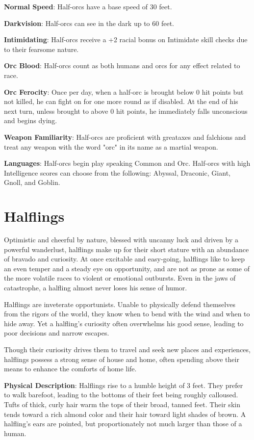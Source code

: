 \textbf{Normal Speed}: Half-orcs have a base speed of 30 feet.
				
\textbf{Darkvision}: Half-orcs can see in the dark up to 60 feet.
				
\textbf{Intimidating}: Half-orcs receive a +2 racial bonus on Intimidate skill checks due to their fearsome nature. 
				
\textbf{Orc Blood}: Half-orcs count as both humans and orcs for any effect related to race.
				
\textbf{Orc Ferocity}: Once per day, when a half-orc is brought below 0 hit points but not killed, he can fight on for one more round as if disabled. At the end of his next turn, unless brought to above 0 hit points, he immediately falls unconscious and begins dying.
				
\textbf{Weapon Familiarity}: Half-orcs are proficient with greataxes and falchions and treat any weapon with the word "orc" in its name as a martial weapon.
				
\textbf{Languages}: Half-orcs begin play speaking Common and Orc. Half-orcs with high Intelligence scores can choose from the following: Abyssal, Draconic, Giant, Gnoll, and Goblin.
							
\section{Halflings}

				
Optimistic and cheerful by nature, blessed with uncanny luck and driven by a powerful wanderlust, halflings make up for their short stature with an abundance of bravado and curiosity. At once excitable and easy-going, halflings like to keep an even temper and a steady eye on opportunity, and are not as prone as some of the more volatile races to violent or emotional outbursts. Even in the jaws of catastrophe, a halfling almost never loses his sense of humor.
				
Halflings are inveterate opportunists. Unable to physically defend themselves from the rigors of the world, they know when to bend with the wind and when to hide away. Yet a halfling's curiosity often overwhelms his good sense, leading to poor decisions and narrow escapes. 
				
Though their curiosity drives them to travel and seek new places and experiences, halflings possess a strong sense of house and home, often spending above their means to enhance the comforts of home life. 
				
\textbf{Physical Description}: Halflings rise to a humble height of 3 feet. They prefer to walk barefoot, leading to the bottoms of their feet being roughly calloused. Tufts of thick, curly hair warm the tops of their broad, tanned feet. Their skin tends toward a rich almond color and their hair toward light shades of brown. A halfling's ears are pointed, but proportionately not much larger than those of a human.
				
